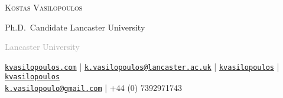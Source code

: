 \documentclass[10pt,]{article}
\begin{document}
              
              
              \centerline{\huge \scshape Kostas Vasilopoulos} %
              
              \vspace{2 mm}
              
              \centerline{\normalsize Ph.D.~Candidate Lancaster University}
              
              \vspace{2 mm}
              
              
              \centerline{\normalsize \textcolor{darkgray}{Lancaster University}}
              
              \begin{center}
                \small
                \faGlobe \hspace{1mm} \href{http://kvasilopoulos.com}{\tt kvasilopoulos.com} \hspace{1mm} | 
                \hspace{1mm}  \faEnvelope \hspace{1mm} \href{mailto:}{\tt \href{mailto:k.vasilopoulos@lancaster.ac.uk}{\nolinkurl{k.vasilopoulos@lancaster.ac.uk}}} \hspace{1mm} | \hspace{1mm} \faGithub \hspace{1mm} \href{http://github.com/kvasilopoulos}{\tt kvasilopoulos} |
                \faLinkedin \hspace{1mm} \href{https://www.linkedin.com/in/kostas-vasilopoulos-130718128/}{\tt kvasilopoulos}
                \\ \vspace{2mm}
                \faEnvelopeO \hspace{1mm} \href{mailto:}{\tt \href{mailto:k.vasilopoulo@gmail.com}{\nolinkurl{k.vasilopoulo@gmail.com}}} \hspace{1mm} | \hspace{1mm} \faPhone +44 (0) 7392971743
              \end{center}
              
              \vspace{2 mm}
              
\end{document}
